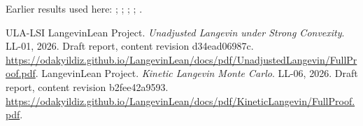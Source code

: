 \documentclass[11pt,a4paper]{article}
\begin{document}
Earlier results used here: \cite[Section~3.17.3]{LangevinLean2026ULASC}; \cite[Section~3.17.4]{LangevinLean2026ULASC}; \cite[Section~3.26.13]{LangevinLean2026ULASC}; \cite[Section~3.26.3]{LangevinLean2026ULASC}; \cite[Section~3.33.11]{LangevinLean2026ULASC}.

\begin{thebibliography}{ULA-LSI}
LangevinLean Project. \emph{Unadjusted Langevin under Strong Convexity}. LL-01, 2026. Draft report, content revision d34ead06987c. \url{https://odakyildiz.github.io/LangevinLean/docs/pdf/UnadjustedLangevin/FullProof.pdf}.
LangevinLean Project. \emph{Kinetic Langevin Monte Carlo}. LL-06, 2026. Draft report, content revision b2fee42a9593. \url{https://odakyildiz.github.io/LangevinLean/docs/pdf/KineticLangevin/FullProof.pdf}.
\end{thebibliography}
\end{document}
